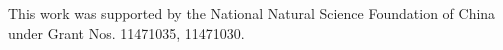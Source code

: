 \documentclass[12pt]{article} %
\newcommand{\bX}{\mathbf{X}}
\newcommand{\bJ}{\mathbf{J}}
\newcommand{\bC}{\mathbf{C}}
\theoremstyle{definition}
\begin{document}
%











%
\vskip 14pt
This work was supported by the National Natural Science Foundation of
China under Grant Nos. 11471035, 11471030.
\par
\end{document}
